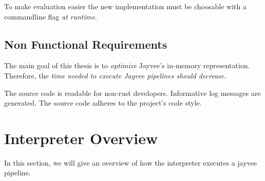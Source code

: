 To make evaluation easier the new implementation must be choosable with a commandline flag \emph{at runtime}.

\subsection{Non Functional Requirements}
\label{subsection:NonFunctionalRequirements}

The main goal of this thesis is to \emph{optimize} Jayvee's in-memory representation.
Therefore, the \emph{time needed to execute Jayvee pipelines should decrease}.

The source code is readable for non-rust developers.
Informative log messages are generated.
The source code adheres to the project's code style.

\section{Interpreter Overview}
\label{section:prev}

In this section, we will give an overview of how the interpreter executes a jayvee pipeline.

